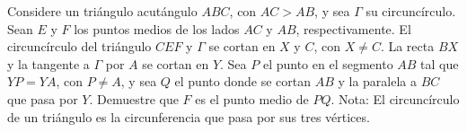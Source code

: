 Considere un triángulo acutángulo $ABC$, con $AC > AB$, y sea $\Gamma$ su circuncírculo. Sean $E$ y $F$ los puntos medios de los lados $AC$ y $AB$, respectivamente. El circuncírculo del triángulo $CEF$ y $\Gamma$ se cortan en $X$ y $C$, con $X \neq C$. La recta $BX$ y la tangente a $\Gamma$ por $A$ se cortan en $Y$. Sea $P$ el punto en el segmento $AB$ tal que$YP = YA$, con $P \neq A$, y sea $Q$ el punto donde se cortan $AB$ y la paralela a $BC$ que pasa por $Y$. Demuestre que $F$ es el punto medio de $PQ$. \newline 
Nota: El circuncírculo de un triángulo es la circunferencia que pasa por sus tres vértices.
